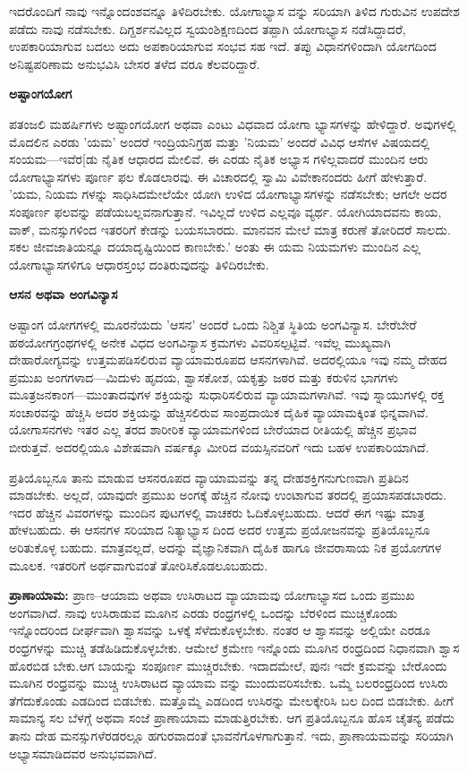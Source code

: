 ಇದರೊಂದಿಗೆ ನಾವು ಇನ್ನೊಂದಂಶವನ್ನೂ ತಿಳಿದಿರಬೇಕು. ಯೋಗಾಭ್ಯಾಸ ವನ್ನು ಸರಿಯಾಗಿ ತಿಳಿದ ಗುರುವಿನ ಉಪದೇಶ ಪಡೆದು ನಾವು ನಡೆಸಬೇಕು. ದಿಗ್ದರ್ಶನವಿಲ್ಲದ ಸ್ವಯಂಶಿಕ್ಷಣದಿಂದ ತಪ್ಪಾಗಿ ಯೋಗಾಭ್ಯಾಸ ನಡೆಸಿದ್ದಾದರೆ, ಉಪಕಾರಿಯಾಗುವ ಬದಲು ಅದು ಅಪಕಾರಿಯಾಗುವ ಸಂಭವ ಸಹ ಇದೆ. ತಪ್ಪು ವಿಧಾನಗಳಿಂದಾಗಿ ಯೋಗದಿಂದ ಅನಿಷ್ಟಪರಿಣಾಮ ಅನುಭವಿಸಿ ಬೇಸರ ತಳೆದ ವರೂ ಕೆಲವರಿದ್ದಾರೆ.

\textbf{ಅಷ್ಟಾಂಗಯೋಗ}

ಪತಂಜಲಿ ಮಹರ್ಷಿಗಳು ಅಷ್ಟಾಂಗಯೋಗ ಅಥವಾ ಎಂಟು ವಿಧವಾದ ಯೋಗಾ ಭ್ಯಾಸಗಳನ್ನು ಹೇಳಿದ್ದಾರೆ. ಅವುಗಳಲ್ಲಿ ಮೊದಲಿನ ಎರಡು 'ಯಮ' ಅಂದರೆ ಇಂದ್ರಿಯನಿಗ್ರಹ ಮತ್ತು 'ನಿಯಮ' ಅಂದರೆ ವಿವಿಧ ಆಸೆಗಳ ವಿಷಯದಲ್ಲಿ ಸಂಯಮ—ಇವೆರ[ಡು ನೈತಿಕ ಆಧಾರದ ಮೇಲಿವೆ. ಈ ಎರಡು ನೈತಿಕ ಅಭ್ಯಾಸ ಗಳಿಲ್ಲವಾದರೆ ಮುಂದಿನ ಆರು ಯೋಗಾಭ್ಯಾಸಗಳು ಪೂರ್ಣ ಫಲ ಕೊಡಲಾರವು. ಈ ವಿಚಾರದಲ್ಲಿ ಸ್ವಾಮಿ ವಿವೇಕಾನಂದರು ಹೀಗೆ ಹೇಳುತ್ತಾರೆ. 'ಯಮ, ನಿಯಮ ಗಳನ್ನು ಸಾಧಿಸಿದಮೇಲೆಯೇ ಯೋಗಿ ಉಳಿದ ಯೋಗಾಭ್ಯಾಸಗಳನ್ನು ನಡೆಸಬೇಕು; ಆಗಲೇ ಅದರ ಸಂಪೂರ್ಣ ಫಲವನ್ನು ಪಡೆಯಬಲ್ಲವನಾಗುತ್ತಾನೆ. ಇವಿಲ್ಲದೆ ಉಳಿದ ಎಲ್ಲವೂ ವ್ಯರ್ಥ. ಯೋಗಿಯಾದವನು ಕಾಯ, ವಾಕ್, ಮನಸ್ಸುಗಳಿಂದ ಇತರರಿಗೆ ಕೇಡನ್ನು ಬಯಸಬಾರದು. ಮಾನವನ ಮೇಲೆ ಮಾತ್ರ ಕರುಣೆ ತೋರಿದರೆ ಸಾಲದು. ಸಕಲ ಜೀವಜಾತಿಯನ್ನೂ ದಯಾದೃಷ್ಟಿಯಿಂದ ಕಾಣಬೇಕು.' ಅಂತು ಈ ಯಮ ನಿಯಮಗಳು ಮುಂದಿನ ಎಲ್ಲ ಯೋಗಾಭ್ಯಾಸಗಳಿಗೂ ಆಧಾರಸ್ತಂಭ ದಂತಿರುವುದನ್ನು ತಿಳಿದಿರಬೇಕು.

\textbf{ಆಸನ ಅಥವಾ ಅಂಗವಿನ್ಯಾಸ}

ಅಷ್ಟಾಂಗ ಯೋಗಗಳಲ್ಲಿ ಮೂರನೆಯದು 'ಆಸನ' ಅಂದರೆ ಒಂದು ನಿಶ್ಚಿತ ಸ್ಥಿತಿಯ ಅಂಗವಿನ್ಯಾಸ. ಬೇರೆಬೇರೆ ಹಠಯೋಗಗ್ರಂಥಗಳಲ್ಲಿ ಅನೇಕ ವಿಧದ ಅಂಗವಿನ್ಯಾಸ ಕ್ರಮಗಳು ವಿವರಿಸಲ್ಪಟ್ಟಿವೆ. ಇವೆಲ್ಲ ಮುಖ್ಯವಾಗಿ ದೇಹಾರೋಗ್ಯವನ್ನು ಉತ್ತಮಪಡಿಸಲಿರುವ ವ್ಯಾಯಾಮರೂಪದ ಆಸನಗಳಾಗಿವೆ. ಅದರಲ್ಲಿಯೂ ಇವು ನಮ್ಮ ದೇಹದ ಪ್ರಮುಖ ಅಂಗಗಳಾದ—ಮಿದುಳು ಹೃದಯ, ಶ್ವಾಸಕೋಶ, ಯಕೃತ್ತು ಜಠರ ಮತ್ತು ಕರುಳಿನ ಭಾಗಗಳು ಮೂತ್ರಜನಕಾಂಗ—ಮುಂತಾದವುಗಳ ಶಕ್ತಿಯನ್ನು ಸುಧಾರಿಸಲಿರುವ ವ್ಯಾಯಾಮಗಳಾಗಿವೆ. ಇವು ಸ್ನಾಯುಗಳಲ್ಲಿ ರಕ್ತ ಸಂಚಾರವನ್ನು ಹೆಚ್ಚಿಸಿ ಅದರ ಶಕ್ತಿಯನ್ನು ಹೆಚ್ಚಿಸಲಿರುವ ಸಾಂಪ್ರದಾಯಿಕ ದೈಹಿಕ ವ್ಯಾಯಾಮಕ್ಕಿಂತ ಭಿನ್ನವಾಗಿವೆ. ಯೋಗಾಸನಗಳು ಇತರ ಎಲ್ಲ ತರದ ಶಾರೀರಿಕ ವ್ಯಾಯಾಮಗಳಿಂದ ಬೇರೆಯಾದ ರೀತಿಯಲ್ಲಿ ಹೆಚ್ಚಿನ ಪ್ರಭಾವ ಬೀರುತ್ತವೆ. ಅದರಲ್ಲಿಯೂ ವಿಶೇಷವಾಗಿ  ವರ್ಷಕ್ಕೂ ಮೀರಿದ ವಯಸ್ಸಿನವರಿಗೆ ಇದು ಬಹಳ ಉಪಕಾರಿಯಾಗಿದೆ.

ಪ್ರತಿಯೊಬ್ಬನೂ ತಾನು ಮಾಡುವ ಆಸನರೂಪದ ವ್ಯಾಯಾಮವನ್ನು ತನ್ನ ದೇಹಶಕ್ತಿಗನುಗುಣವಾಗಿ ಪ್ರತಿದಿನ ಮಾಡಬೇಕು. ಅಲ್ಲದೆ, ಯಾವುದೇ ಪ್ರಮುಖ ಅಂಗಕ್ಕೆ ಹೆಚ್ಚಿನ ನೋವು ಉಂಟಾಗುವ ತರದಲ್ಲಿ ಪ್ರಯಾಸಪಡಬಾರದು. ಇದರ ಹೆಚ್ಚಿನ ವಿವರಗಳನ್ನು ಮುಂದಿನ ಪುಟಗಳಲ್ಲಿ ವಾಚಕರು ಓದಿಕೊಳ್ಳಬಹುದು. ಆದರೆ ಈಗ ಇಷ್ಟು ಮಾತ್ರ ಹೇಳಬಹುದು. ಈ ಆಸನಗಳ ಸರಿಯಾದ ನಿತ್ಯಾಭ್ಯಾಸ ದಿಂದ ಅದರ ಉತ್ತಮ ಪ್ರಯೋಜನವನ್ನು ಪ್ರತಿಯೊಬ್ಬನೂ ಅರಿತುಕೊಳ್ಳ ಬಹುದು. ಮಾತ್ರವಲ್ಲದೆ, ಅದನ್ನು ವೈಜ್ಞಾನಿಕವಾಗಿ ದೈಹಿಕ ಹಾಗೂ ಜೀವರಾಸಾಯ ನಿಕ ಪ್ರಯೋಗಗಳ ಮೂಲಕ. ಇತರರಿಗೆ ಅರ್ಥವಾಗುವಂತೆ ತೋರಿಸಿಕೊಡಲೂಬಹುದು.

\textbf{ಪ್ರಾಣಾಯಾಮ:} ಪ್ರಾಣ–ಆಯಾಮ ಅಥವಾ ಉಸಿರಾಟದ ವ್ಯಾಯಾಮವು ಯೋಗಾಭ್ಯಾಸದ ಒಂದು ಪ್ರಮುಖ ಅಂಗವಾಗಿದೆ. ನಾವು ಉಸಿರಾಡುವ ಮೂಗಿನ ಎರಡು ರಂಧ್ರಗಳಲ್ಲಿ ಒಂದನ್ನು ಬೆರಳಿಂದ ಮುಚ್ಚಿಕೊಂಡು ಇನ್ನೊಂದರಿಂದ ದೀರ್ಘವಾಗಿ ಶ್ವಾಸವನ್ನು ಒಳಕ್ಕೆ ಸೆಳೆದುಕೊಳ್ಳಬೇಕು. ನಂತರ ಆ ಶ್ವಾಸವನ್ನು ಅಲ್ಲಿಯೇ ಎರಡೂ ರಂಧ್ರಗಳನ್ನು ಮುಚ್ಚಿ ತಡೆಹಿಡಿದುಕೊಳ್ಳಬೇಕು. ಆಮೇಲೆ ಕ್ರಮೇಣ ಇನ್ನೊಂದು ಮೂಗಿನ ರಂಧ್ರದಿಂದ ನಿಧಾನವಾಗಿ ಶ್ವಾಸ ಹೊರಬಿಡ ಬೇಕು.ಆಗ ಬಾಯನ್ನು ಸಂಪೂರ್ಣ ಮುಚ್ಚಿರಬೇಕು. ಇದಾದಮೇಲೆ, ಪುನಃ ಇದೇ ಕ್ರಮವನ್ನು ಬೇರೊಂದು ಮೂಗಿನ ರಂಧ್ರವನ್ನು ಮುಚ್ಚಿ ಉಸಿರಾಟದ ವ್ಯಾಯಾಮ ವನ್ನು ಮುಂದುವರಿಸಬೇಕು. ಒಮ್ಮೆ ಬಲರಂಧ್ರದಿಂದ ಉಸಿರು ತೆಗೆದುಕೊಂಡು ಎಡದಿಂದ ಬಿಡಬೇಕು. ಮತ್ತೊಮ್ಮೆ ಎಡದಿಂದ ಉಸಿರನ್ನು ಮೇಲಕ್ಕೇರಿಸಿ ಬಲ ದಿಂದ ಬಿಡಬೇಕು. ಹೀಗೆ ಸಾಮಾನ್ಯ  ಸಲ ಬೆಳಗ್ಗೆ ಅಥವಾ ಸಂಜೆ ಪ್ರಾಣಾಯಾಮ ಮಾಡುತ್ತಿರಬೇಕು. ಆಗ ಪ್ರತಿಯೊಬ್ಬನೂ ಹೊಸ ಚೈತನ್ಯ ಪಡೆದು ತಾನು ದೇಹ ಮನಸ್ಸುಗಳೆರಡರಲ್ಲೂ ಹಗುರವಾದಂತೆ ಭಾವನೆಗೊಳಗಾಗುತ್ತಾನೆ. ಇದು, ಪ್ರಾಣಾಯಮವನ್ನು ಸರಿಯಾಗಿ ಅಭ್ಯಾಸಮಾಡಿದವರ ಅನುಭವವಾಗಿದೆ.

